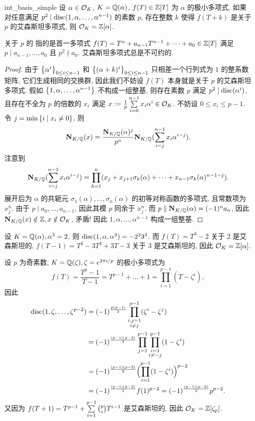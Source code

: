 \begin{proposition}{}{int_basis_simple}
设 $\alpha\in{\mathcal{O}}_K$, $K={\mathbb{Q}}(\alpha)$, $f(T)\in{\mathbb{Z}}[T]$ 为 $\alpha$ 的极小多项式. 如果对任意满足 $p^2\mid{\mathrm{disc}}(1,\alpha,\dots,\alpha^{n-1})$ 的素数 $p$, 存在整数 $k$ 使得 $f(T+k)$ 是关于 $p$ 的艾森斯坦多项式, 则 ${\mathcal{O}}_K={\mathbb{Z}}[\alpha]$.
\end{proposition}

关于 $p$ 的 指的是首一多项式 $f(T)=T^n+a_{n-1}T^{n-1}+\dots+a_0 \in{\mathbb{Z}}[T]$ 满足 $p\mid a_{n-1},\dots,a_0$ 且 $p^2\nmid a_0$. 艾森斯坦多项式总是不可约的.

\begin{proof}
由于 $\left\{\alpha^i\right\}_{0\le i\le n-1}$ 和 $\left\{(\alpha+k)^i\right\}_{0\le i\le n-1}$ 只相差一个行列式为 $1$ 的整系数矩阵, 它们生成相同的交换群, 因此我们不妨设 $f(T)$ 本身就是关于 $p$ 的艾森斯坦多项式.
假如 $\left\{1,\alpha,\dots,\alpha^{n-1}\right\}$ 不构成一组整基, 则存在素数 $p$ 满足 $p^2\mid {\mathrm{disc}}(\alpha^i)$, 且存在不全为 $p$ 的倍数的 $x_i$ 满足 $x:=\frac{1}{p}\sum\limits_{i=0}^{n-1} x_i\alpha^i \in {\mathcal{O}}_K$. 不妨设 $0\le x_i\le p-1$. 令 $j=\min\left\{i\mid x_i\neq 0\right\}$, 则
  \[{\mathbf{N}}_{K/{\mathbb{Q}}}(x)=\frac{{\mathbf{N}}_{K/{\mathbb{Q}}}(\alpha)^j}{p^n}{\mathbf{N}}_{K/{\mathbb{Q}}}(\sum_{i=j}^{n-1}x_i\alpha^{i-j}).\]
注意到
  \[{\mathbf{N}}_{K/{\mathbb{Q}}}(\sum_{i=j}^{n-1}x_i\alpha^{i-j})=\prod_{k=1}^n(x_j+x_{j+1}\sigma_k(\alpha)+\dots+x_{n-1}\sigma_k(\alpha)^{n-1-j}).\]
展开后为 $\alpha$ 的共轭元 $\sigma_1(\alpha),\dots,\sigma_n(\alpha)$ 的初等对称函数的多项式, 且常数项为 $x_j^n$. 由于 $p\mid a_0,\dots,a_{n-1}$, 因此其模 $p$ 同余于 $x_j^n$. 而 $p\parallel {\mathbf{N}}_{K/{\mathbb{Q}}}(\alpha)=(-1)^n a_n$, 因此 ${\mathbf{N}}_{K/{\mathbb{Q}}}(x)\notin{\mathbb{Z}},x\notin {\mathcal{O}}_K$, 矛盾! 因此 $1,\alpha,\dots,\alpha^{n-1}$ 构成一组整基.
\end{proof}

\begin{example}
设 $K={\mathbb{Q}}(\alpha),\alpha^3=2$. 则 ${\mathrm{disc}}(1,\alpha,\alpha^2)=-2^2 3^3$. 而 $f(T)=T^3-2$ 关于 $2$ 是艾森斯坦的, $f(T-1)=T^3-3T^2+3T-3$ 关于 $3$ 是艾森斯坦的, 因此 ${\mathcal{O}}_K={\mathbb{Z}}[\alpha]$.
\end{example}

\begin{example}\label{exe:cyclo_p}
设 $p$ 为奇素数, $K={\mathbb{Q}}(\zeta),\zeta=e^{2\pi i/p}$ 的极小多项式为
  \[f(T)=\frac{T^p-1}{T-1}=T^{p-1}+\dots+1=\prod\limits_{i=1}^{p-1}(T-\zeta^i),\]
因此
\begin{align*}
{\mathrm{disc}}(1,\zeta,\dots,\zeta^{p-2})&=(-1)^{\frac{p(p-1)}{2}}\prod_{\substack{i,j=1\\ i\neq j}}^{p-1}(\zeta^i-\zeta^j)\\
&=(-1)^{\frac{(p-1)(p-2)}{2}}\prod_{j=1}^{p-1}\prod_{\substack{i=1\\ i\neq-j}}^{p-1}(1-\zeta^i)\\
&=(-1)^{\frac{(p-1)(p-2)}{2}}\Bigl(\prod_{i=1}^{p-1}(1-\zeta^i)\Bigr)^{p-2}\\
&=(-1)^{\frac{(p-1)(p-2)}{2}}f(1)^{p-2}=(-1)^{\frac{(p-1)(p-2)}{2}}p^{p-2}.
\end{align*}
又因为 $f(T+1)=T^{p-1}+\sum\limits_{i=1}^{p-1}{p\choose i}T^{i-1}$ 是艾森斯坦的, 因此 ${\mathcal{O}}_K={\mathbb{Z}}[\zeta_p]$.
\end{example}

